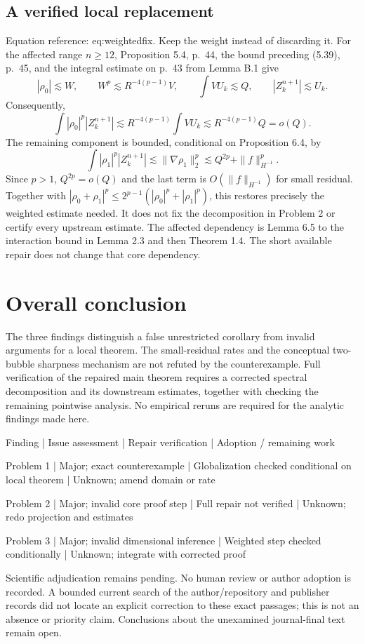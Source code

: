 \documentclass[10pt]{article}
\begin{document}
\subsection*{A verified local replacement}
Equation reference: eq:weightedfix. Keep the weight instead of discarding it. For the affected range \(n\ge12\), Proposition 5.4, p. 44, the bound preceding (5.39), p. 45, and the integral estimate on p. 43 from Lemma B.1 give \[|\rho_0|\lesssim W,\qquad
 W^p\lesssim R^{-4(p-1)}V,\qquad
 \int VU_k\lesssim Q,\qquad |Z_k^{n+1}|\lesssim U_k.\] Consequently, \[
 \int |\rho_0|^p|Z_k^{n+1}|
 \lesssim R^{-4(p-1)}\int VU_k
 \lesssim R^{-4(p-1)}Q=o(Q).\] The remaining component is bounded, conditional on Proposition 6.4, by \[\int|\rho_1|^p|Z_k^{n+1}|
 \lesssim\|\nabla\rho_1\|_2^p
 \lesssim Q^{2p}+\|f\|_{H^{-1}}^p.\] Since \(p>1\), \(Q^{2p}=o(Q)\) and the last term is \(O(\|f\|_{H^{-1}})\) for small residual. Together with \(|\rho_0+\rho_1|^p\le2^{p-1}(|\rho_0|^p+|\rho_1|^p)\), this restores precisely the weighted estimate needed. It does not fix the decomposition in Problem 2 or certify every upstream estimate. The affected dependency is Lemma 6.5 to the interaction bound in Lemma 2.3 and then Theorem 1.4. The short available repair does not change that core dependency.\par
\section*{Overall conclusion}
The three findings distinguish a false unrestricted corollary from invalid arguments for a local theorem. The small-residual rates and the conceptual two-bubble sharpness mechanism are not refuted by the counterexample. Full verification of the repaired main theorem requires a corrected spectral decomposition and its downstream estimates, together with checking the remaining pointwise analysis. No empirical reruns are required for the analytic findings made here.\par
Finding | Issue assessment | Repair verification | Adoption / remaining work\par
Problem 1 | Major; exact counterexample | Globalization checked conditional on local theorem | Unknown; amend domain or rate\par
Problem 2 | Major; invalid core proof step | Full repair not verified | Unknown; redo projection and estimates\par
Problem 3 | Major; invalid dimensional inference | Weighted step checked conditionally | Unknown; integrate with corrected proof\par
Scientific adjudication remains pending. No human review or author adoption is recorded. A bounded current search of the author/repository and publisher records did not locate an explicit correction to these exact passages; this is not an absence or priority claim. Conclusions about the unexamined journal-final text remain open.\par
\end{document}
